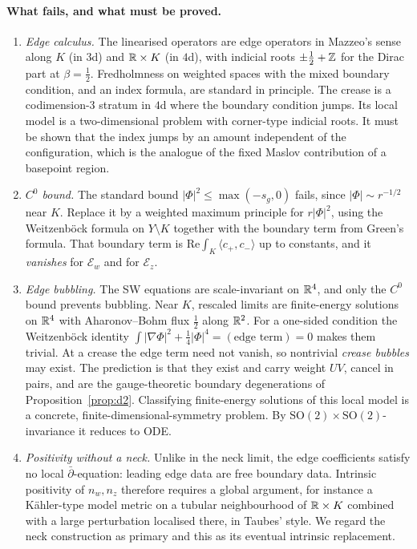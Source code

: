 \paragraph{What fails, and what must be proved.}
\begin{enumerate}[label=(\roman*),leftmargin=2em]
\item \emph{Edge calculus.}  The linearised operators are edge operators in Mazzeo's sense \cite{Mazzeo} along $K$ (in $3$d) and
$\mathbb{R}\times K$ (in $4$d), with indicial roots $\pm\frac12+\mathbb{Z}$ for the Dirac part at $\beta=\frac12$.  Fredholmness on weighted spaces with
the mixed boundary condition, and an index formula, are standard in principle.  The crease is a codimension-$3$
stratum in $4$d where the boundary condition jumps.  Its local model is a two-dimensional problem with corner-type
indicial roots.  It must be shown that the index jumps by an amount independent of the configuration, which is the
analogue of the fixed Maslov contribution of a basepoint region.
\item \emph{$C^0$ bound.}  The standard bound $|\Phi|^2\le\max(-s_g,0)$ fails, since $|\Phi|\sim r^{-1/2}$ near $K$.  Replace it by a
weighted maximum principle for $r|\Phi|^2$, using the Weitzenböck formula on $Y\setminus K$ together with the boundary term from
Green's formula.  That boundary term is $\mathrm{Re}\int_K\langle c_+,c_-\rangle$ up to constants, and it \emph{vanishes} for $\mathcal E_w$ and for
$\mathcal E_z$.
\item \emph{Edge bubbling.}  The SW equations are scale-invariant on $\mathbb{R}^4$, and only the $C^0$ bound prevents bubbling.
Near $K$, rescaled limits are finite-energy solutions on $\mathbb{R}^4$ with Aharonov--Bohm flux $\frac12$ along $\mathbb{R}^2$.  For a
one-sided condition the Weitzenböck identity $\int|\nabla\Phi|^2+\frac14|\Phi|^4=(\text{edge term})=0$ makes them trivial.  At a crease
the edge term need not vanish, so nontrivial \emph{crease bubbles} may exist.  The prediction is that they exist and
carry weight $UV$, cancel in pairs, and are the gauge-theoretic boundary degenerations of
Proposition~\ref{prop:d2}.  Classifying finite-energy solutions of this local model is a concrete,
finite-dimensional-symmetry problem.  By $\mathrm{SO}(2)\times\mathrm{SO}(2)$-invariance it reduces to ODE.
\item \emph{Positivity without a neck.}  Unlike in the neck limit, the edge coefficients satisfy no local
$\bar\partial$-equation: leading edge data are free boundary data.  Intrinsic positivity of $n_w,n_z$ therefore requires a
global argument, for instance a Kähler-type model metric on a tubular neighbourhood of $\mathbb{R}\times K$ combined with a
large perturbation localised there, in Taubes' style.  We regard the neck construction as primary and this as its
eventual intrinsic replacement.
\end{enumerate}

